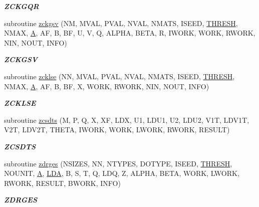 \begin{DoxyCompactItemize}
\begin{DoxyCompactList}\small\item\em {\bfseries Z\+C\+K\+G\+Q\+R} \end{DoxyCompactList}\item 
subroutine \hyperlink{group__complex16__eig_ga3a1762cecf9f9df47372de50edff2380}{zckgsv} (N\+M, M\+V\+A\+L, P\+V\+A\+L, N\+V\+A\+L, N\+M\+A\+T\+S, I\+S\+E\+E\+D, \hyperlink{zlaqgs_8c_a0656018abfc9fa2821827415f5d5ea57}{T\+H\+R\+E\+S\+H}, N\+M\+A\+X, \hyperlink{classA}{A}, A\+F, B, B\+F, U, V, Q, A\+L\+P\+H\+A, B\+E\+T\+A, R, I\+W\+O\+R\+K, W\+O\+R\+K, R\+W\+O\+R\+K, N\+I\+N, N\+O\+U\+T, I\+N\+F\+O)
\begin{DoxyCompactList}\small\item\em {\bfseries Z\+C\+K\+G\+S\+V} \end{DoxyCompactList}\item 
subroutine \hyperlink{group__complex16__eig_ga5a3131eede15fe6df2ab00e42c3f2ff6}{zcklse} (N\+N, M\+V\+A\+L, P\+V\+A\+L, N\+V\+A\+L, N\+M\+A\+T\+S, I\+S\+E\+E\+D, \hyperlink{zlaqgs_8c_a0656018abfc9fa2821827415f5d5ea57}{T\+H\+R\+E\+S\+H}, N\+M\+A\+X, \hyperlink{classA}{A}, A\+F, B, B\+F, X, W\+O\+R\+K, R\+W\+O\+R\+K, N\+I\+N, N\+O\+U\+T, I\+N\+F\+O)
\begin{DoxyCompactList}\small\item\em {\bfseries Z\+C\+K\+L\+S\+E} \end{DoxyCompactList}\item 
subroutine \hyperlink{group__complex16__eig_gaf744ea7ce60893481da2287736a5e860}{zcsdts} (M, P, Q, X, X\+F, L\+D\+X, U1, L\+D\+U1, U2, L\+D\+U2, V1\+T, L\+D\+V1\+T, V2\+T, L\+D\+V2\+T, T\+H\+E\+T\+A, I\+W\+O\+R\+K, W\+O\+R\+K, L\+W\+O\+R\+K, R\+W\+O\+R\+K, R\+E\+S\+U\+L\+T)
\begin{DoxyCompactList}\small\item\em {\bfseries Z\+C\+S\+D\+T\+S} \end{DoxyCompactList}\item 
subroutine \hyperlink{group__complex16__eig_ga81ce6378154b5d55bedfa1241bb928d1}{zdrges} (N\+S\+I\+Z\+E\+S, N\+N, N\+T\+Y\+P\+E\+S, D\+O\+T\+Y\+P\+E, I\+S\+E\+E\+D, \hyperlink{zlaqgs_8c_a0656018abfc9fa2821827415f5d5ea57}{T\+H\+R\+E\+S\+H}, N\+O\+U\+N\+I\+T, \hyperlink{classA}{A}, \hyperlink{example__user_8c_ae946da542ce0db94dced19b2ecefd1aa}{L\+D\+A}, B, S, T, Q, L\+D\+Q, Z, A\+L\+P\+H\+A, B\+E\+T\+A, W\+O\+R\+K, L\+W\+O\+R\+K, R\+W\+O\+R\+K, R\+E\+S\+U\+L\+T, B\+W\+O\+R\+K, I\+N\+F\+O)
\begin{DoxyCompactList}\small\item\em {\bfseries Z\+D\+R\+G\+E\+S} \end{DoxyCompactList}\item 

\end{DoxyCompactItemize}
